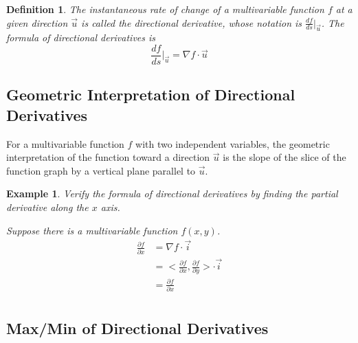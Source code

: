 \documentclass{article}
\newtheorem*{definition}{Definition}
\newtheorem{example}{Example}
\begin{document}
\begin{definition}
  The instantaneous rate of change of a multivariable function $f$ at a given 
  direction $\vec{u}$ is called the directional derivative, whose notation is 
  $\frac{df}{ds}|_{\vec{u}}$. The formula of directional derivatives is 
  \[ \frac{df}{ds}|_{\vec{u}} = \nabla f \cdot \vec{u} \]
\end{definition}

\subsection{Geometric Interpretation of Directional Derivatives}

For a multivariable function $f$ with two independent variables, the geometric 
interpretation of the function toward a direction $\vec{u}$ is the slope of the 
slice of the function graph by a vertical plane parallel to $\vec{u}$.

\begin{example}
  Verify the formula of directional derivatives by finding the partial 
  derivative along the $x$ axis.

  Suppose there is a multivariable function $f(x, y)$.
  \begin{equation*}
    \begin{split}
      \frac{\partial f}{\partial x} &= \nabla f \cdot \vec{i} \\
                                    &= <\frac{\partial f}{\partial x}, \frac{\partial f}{\partial y}> \cdot \vec{i} \\
                                    &= \frac{\partial f}{\partial x} \\
    \end{split}
  \end{equation*}
\end{example}

\subsection{Max/Min of Directional Derivatives}
\end{document}
